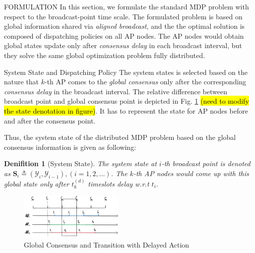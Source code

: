 \documentclass[10pt, conference, letterpaper]{IEEEtran}
\newtheorem{definition}{Denifition}
\newcommand{\define}{\triangleq}
\newcommand{\Stat}{\mathbf{S}}
\newcommand{\Obsv}{\mathcal{Y}}
\begin{document}
    \begin{section}{FORMULATION}
        \label{sec:formulation}
        In this section, we formulate the standard MDP problem with respect to the broadcast-point time scale. The formulated problem is based on global information shared via \emph{aligned broadcast}, and the the optimal solution is composed of dispatching policies on all AP nodes. The AP nodes would obtain global states update only after \emph{consensus delay} in each broadcast interval, but they solve the same global optimization problem fully distributed.

        \begin{subsection}{System State and Dispatching Policy}
            The system states is selected based on the nature that $k$-th AP comes to the \emph{global consensus} only after the corresponding \emph{consensus delay} in the broadcast interval.
            The relative difference between broadcast point and global consensus point is depicted in Fig. \ref{fig:br-trans} \hl{(need to modify the state denotation in figure)}. It has to represent the state for AP nodes before and after the consensus point.

            Thus, the system state of the distributed MDP problem based on the global consensus information is given as following:
            \begin{definition}[System State]
                The system state at $i$-th broadcast point is denoted as $\Stat_i \define (\Obsv_{i}, \Obsv_{i-1}), (i=1,2,\dots)$.
                The $k$-th AP nodes would come up with this global state only after $t^{(d)}_k$ timeslots delay w.r.t $t_i$.
            \end{definition}
            \begin{figure}[ht]
                \centering
                \includegraphics[width=0.45\textwidth]{broadcast-trans.png}
                \caption{Global Consensus and Transition with Delayed Action}
                \label{fig:br-trans}
            \end{figure}


\end{subsection}
\end{section}
\end{document}
